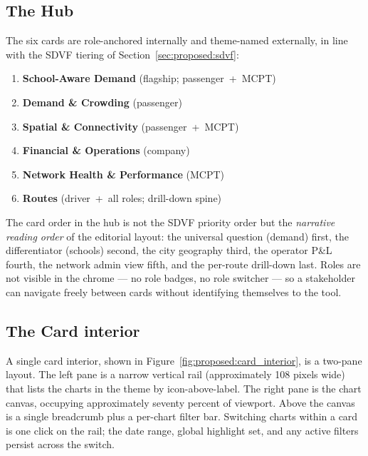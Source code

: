 \subsection{The Hub}
\label{sec:proposed:hub}

The six cards are role-anchored internally and theme-named
externally, in line with the SDVF tiering of
Section~\ref{sec:proposed:sdvf}:

\begin{enumerate}
\item \textbf{School-Aware Demand} (flagship; passenger~+~MCPT)
\item \textbf{Demand \& Crowding} (passenger)
\item \textbf{Spatial \& Connectivity} (passenger~+~MCPT)
\item \textbf{Financial \& Operations} (company)
\item \textbf{Network Health \& Performance} (MCPT)
\item \textbf{Routes} (driver~+~all roles; drill-down spine)
\end{enumerate}

The card order in the hub is not the SDVF priority order but the
\emph{narrative reading order} of the editorial layout: the
universal question (demand) first, the differentiator (schools)
second, the city geography third, the operator P\&L fourth, the
network admin view fifth, and the per-route drill-down last.
Roles are not visible in the chrome --- no role badges, no role
switcher --- so a stakeholder can navigate freely between cards
without identifying themselves to the tool.

\subsection{The Card interior}
\label{sec:proposed:card}

A single card interior, shown in
Figure~\ref{fig:proposed:card_interior}, is a two-pane layout.
The left pane is a narrow vertical rail (approximately 108
pixels wide) that lists the charts in the theme by icon-above-label.
The right pane is the chart canvas, occupying approximately
seventy percent of viewport. Above the canvas is a single
breadcrumb plus a per-chart filter bar. Switching charts within
a card is one click on the rail; the date range, global
highlight set, and any active filters persist across the switch.


